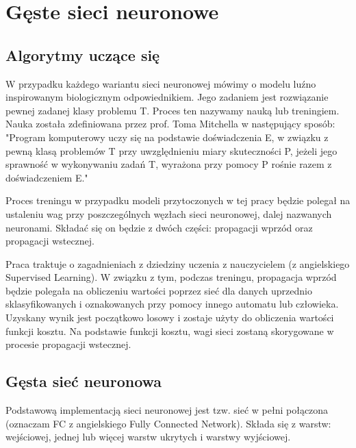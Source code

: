 \chapter{Gęste sieci neuronowe}
\label{chap:siecifc}

\section{Algorytmy uczące się}

W przypadku każdego wariantu sieci neuronowej mówimy o modelu luźno inspirowanym biologicznym odpowiednikiem. Jego zadaniem jest rozwiązanie pewnej zadanej klasy problemu T. Proces ten nazywamy nauką lub treningiem. Nauka została zdefiniowana przez prof. Toma Mitchella w następujący sposób: "Program komputerowy uczy się na podstawie doświadczenia E, w związku z pewną klasą problemów T przy uwzględnieniu miary skuteczności P, jeżeli jego sprawność w wykonywaniu zadań T, wyrażona przy pomocy P rośnie razem z doświadczeniem E."

Proces treningu w przypadku modeli przytoczonych w tej pracy będzie polegał na ustaleniu wag przy poszczególnych węzłach sieci neuronowej, dalej nazwanych neuronami. Składać się on będzie z dwóch części: propagacji wprzód oraz propagacji wstecznej. 

Praca traktuje o zagadnieniach z dziedziny uczenia z nauczycielem (z angielskiego Supervised Learning). W związku z tym, podczas treningu, propagacja wprzód będzie polegała na obliczeniu wartości poprzez sieć dla danych uprzednio sklasyfikowanych i oznakowanych przy pomocy innego automatu lub człowieka. Uzyskany wynik jest początkowo losowy i zostaje użyty do obliczenia wartości funkcji kosztu. Na podstawie funkcji kosztu, wagi sieci zostaną skorygowane w procesie propagacji wstecznej.

\section{Gęsta sieć neuronowa}

Podstawową implementacją sieci neuronowej jest tzw. sieć w pełni połączona (oznaczam FC z angielskiego Fully Connected Network). Składa się z warstw: wejściowej, jednej lub więcej warstw ukrytych i warstwy wyjściowej.  


